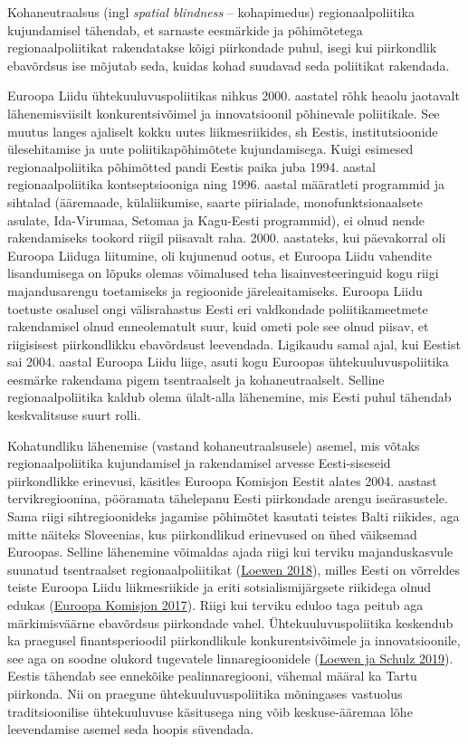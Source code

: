 \documentclass[estonian,]{article}
\begin{document}
\begin{blockquote-left}
Kohaneutraalsus (ingl \emph{spatial blindness} -- kohapimedus)
regionaalpoliitika kujundamisel tähendab, et sarnaste eesmärkide ja
põhimõtetega regionaalpoliitikat rakendatakse kõigi piirkondade puhul,
isegi kui piirkondlik ebavõrdsus ise mõjutab seda, kuidas kohad suudavad
seda poliitikat rakendada.
\end{blockquote-left}

Euroopa Liidu ühtekuuluvuspoliitikas nihkus 2000. aastatel rõhk heaolu jaotavalt lähenemisviisilt konkurentsivõimel ja innovatsioonil põhinevale poliitikale. See muutus langes ajaliselt kokku uutes liikmesriikides, sh Eestis, institutsioonide ülesehitamise ja uute poliitikapõhimõtete kujundamisega. Kuigi esimesed regionaalpoliitika põhimõtted pandi Eestis paika juba 1994. aastal regionaalpoliitika kontseptsiooniga ning 1996. aastal määratleti programmid ja sihtalad (ääremaade, külaliikumise, saarte piirialade, monofunktsionaalsete asulate, Ida-Virumaa, Setomaa ja Kagu-Eesti programmid), ei olnud nende rakendamiseks tookord riigil piisavalt raha. 2000. aastateks, kui päevakorral oli Euroopa Liiduga liitumine, oli kujunenud ootus, et Euroopa Liidu vahendite lisandumisega on lõpuks olemas võimalused teha lisainvesteeringuid kogu riigi majandusarengu toetamiseks ja regioonide järeleaitamiseks. Euroopa Liidu toetuste osalusel ongi välisrahastus Eesti eri valdkondade poliitikameetmete rakendamisel olnud enneolematult suur, kuid ometi pole see olnud piisav, et riigisisest piirkondlikku ebavõrdsust leevendada. Ligikaudu samal ajal, kui Eestist sai 2004. aastal Euroopa Liidu liige, asuti kogu Euroopas ühtekuuluvuspoliitika eesmärke rakendama pigem tsentraalselt ja kohaneutraalselt. Selline regionaalpoliitika kaldub olema ülalt-alla lähenemine, mis Eesti puhul tähendab keskvalitsuse suurt rolli.

Kohatundliku lähenemise (vastand kohaneutraalsusele) asemel, mis võtaks regionaalpoliitika kujundamisel ja rakendamisel arvesse Eesti-siseseid piirkondlikke erinevusi, käsitles Euroopa Komisjon Eestit alates 2004. aastast tervikregioonina, pööramata tähelepanu Eesti piirkondade arengu iseärasustele. Sama riigi sihtregioonideks jagamise põhimõtet kasutati teistes Balti riikides, aga mitte näiteks Sloveenias, kus piirkondlikud erinevused on ühed väiksemad Euroopas. Selline lähenemine võimaldas ajada riigi kui terviku majanduskasvule suunatud tsentraalset regionaalpoliitikat (\protect\hyperlink{Loewen2018}{Loewen 2018}), milles Eesti on võrreldes teiste Euroopa Liidu liikmesriikide ja eriti sotsialismijärgsete riikidega olnud edukas (\protect\hyperlink{Euroopa-Komisjon2017}{Euroopa Komisjon 2017}). Riigi kui terviku eduloo taga peitub aga märkimisväärne ebavõrdsus piirkondade vahel. Ühtekuuluvuspoliitika keskendub ka praegusel finantsperioodil piirkondlikule konkurentsivõimele ja innovatsioonile, see aga on soodne olukord tugevatele linnaregioonidele (\protect\hyperlink{Loewen2019}{Loewen ja Schulz 2019}). Eestis tähendab see ennekõike pealinnaregiooni, vähemal määral ka Tartu piirkonda. Nii on praegune ühtekuuluvuspoliitika mõningases vastuolus traditsioonilise ühtekuuluvuse käsitusega ning võib keskuse-ääremaa lõhe leevendamise asemel seda hoopis süvendada.
\end{document}
